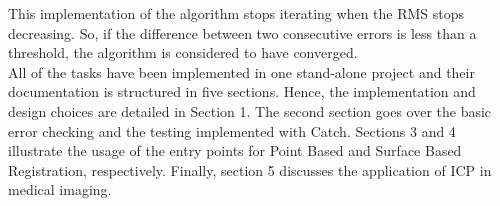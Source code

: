 \documentclass{article}
\begin{document}
This implementation of the algorithm stops iterating when the RMS stops decreasing. So, if the difference between two consecutive errors is less than a threshold, the algorithm is considered to have converged.\\

All of the tasks have been implemented in one stand-alone project and their documentation is structured in five sections. Hence, the implementation and design choices are detailed in Section 1. The second section goes over the basic error checking and the testing implemented with Catch. Sections 3 and 4 illustrate the usage of the entry points for Point Based and Surface Based Registration, respectively. Finally, section 5 discusses the application of ICP in medical imaging.

\clearpage

\end{document}
